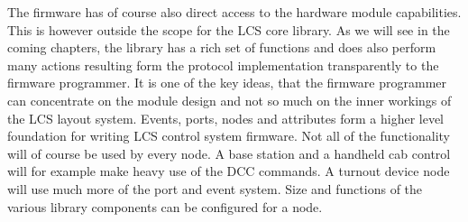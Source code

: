 \begin{center}
\end{center}

The firmware has of course also direct access to the hardware module capabilities. This is however outside the scope for the LCS core library. As we will see in the coming chapters, the library has a rich set of functions and does also perform many actions resulting form the protocol implementation transparently to the firmware programmer. It is one of the key ideas, that the firmware programmer can concentrate on the module design and not so much on the inner workings of the LCS layout system. Events, ports, nodes and attributes form a higher level foundation for writing LCS control system firmware. Not all of the functionality will of course be used by every node. A base station and a handheld cab control will for example make heavy use of the DCC commands. A turnout device node will use much more of the port and event system. Size and functions of the various library components can be configured for a node.


